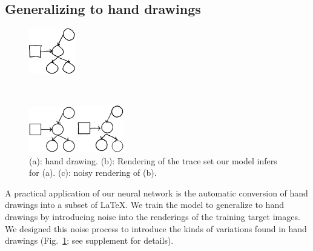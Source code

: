 \documentclass{article}
\theoremstyle{definition}
\begin{document}
\subsection{Generalizing to hand drawings}\label{generalizingTheHandDrawings}
\begin{figure}
\centering  \begin{minipage}[t]{2.5cm}\centering\includegraphics[width = 2cm]{figures/expert-60-reduced.png}
    \subcaption{}
  \end{minipage}\\
   \begin{minipage}[t]{2.5cm}\includegraphics[width = 2cm]{figures/60-groundTruth-reduced.png}
    \subcaption{}
  \end{minipage}%
  \begin{minipage}[t]{2.5cm}\includegraphics[width = 2cm]{figures/60-1-reduced.png}
    \subcaption{}
  \end{minipage}%
    \caption{(a): hand drawing. (b): Rendering of the trace set our model infers for (a). (c): noisy rendering of (b).}\label{handDrawingExamples}
\end{figure}

A practical application of our neural network is the automatic conversion of hand drawings into a subset of \LaTeX.
 We train the model
to generalize to hand drawings by introducing noise into the
renderings of the training target images.
We designed this noise process to introduce the kinds of variations found in hand drawings (Fig.~\ref{handDrawingExamples}; see supplement for details).
\end{document}
